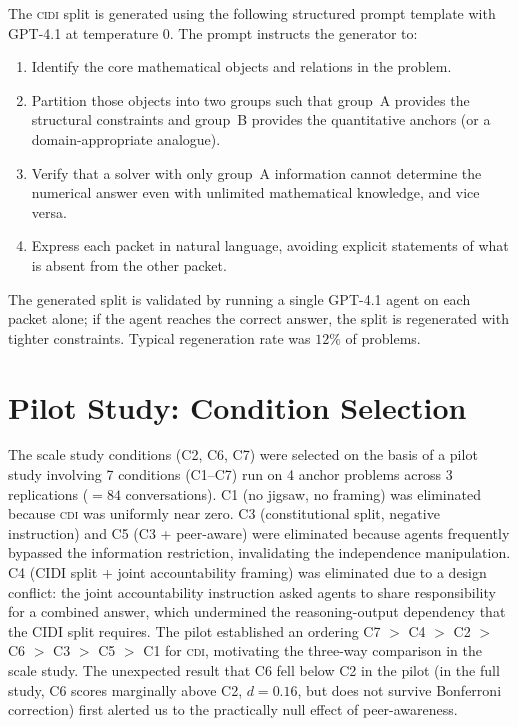 \documentclass{article}
\newcommand{\CDI}{\textsc{cdi}}
\newcommand{\CIDI}{\textsc{cidi}}
\begin{document}
The \CIDI{} split is generated using the following structured prompt
template with GPT-4.1 at temperature 0. The prompt instructs the
generator to:
\begin{enumerate}
  \item Identify the core mathematical objects and relations in the
  problem.
  \item Partition those objects into two groups such that group~A
  provides the structural constraints and group~B provides the
  quantitative anchors (or a domain-appropriate analogue).
  \item Verify that a solver with only group~A information cannot
  determine the numerical answer even with unlimited mathematical
  knowledge, and vice versa.
  \item Express each packet in natural language, avoiding explicit
  statements of what is absent from the other packet.
\end{enumerate}
The generated split is validated by running a single GPT-4.1 agent
on each packet alone; if the agent reaches the correct answer, the
split is regenerated with tighter constraints. Typical regeneration
rate was $12\%$ of problems.

\section{Pilot Study: Condition Selection}
\label{app:pilot}

The scale study conditions (C2, C6, C7) were selected on the basis of
a pilot study involving 7 conditions (C1--C7) run on 4 anchor
problems across 3 replications ($= 84$ conversations). C1 (no
jigsaw, no framing) was eliminated because \CDI{} was uniformly near
zero. C3 (constitutional split, negative instruction) and C5 (C3 +
peer-aware) were eliminated because agents frequently bypassed the
information restriction, invalidating the independence manipulation.
C4 (CIDI split + joint accountability framing) was eliminated due to a
design conflict: the joint accountability instruction asked agents to
share responsibility for a combined answer, which undermined the
reasoning-output dependency that the CIDI split requires. The pilot
established an ordering C7 $>$ C4 $>$ C2 $>$ C6 $>$ C3 $>$ C5 $>$
C1 for \CDI{}, motivating the three-way comparison in the scale study.
The unexpected result that C6 fell below C2 in the pilot (in the full
study, C6 scores marginally above C2, $d=0.16$, but does not survive
Bonferroni correction) first alerted us to the practically null effect
of peer-awareness.
\end{document}
